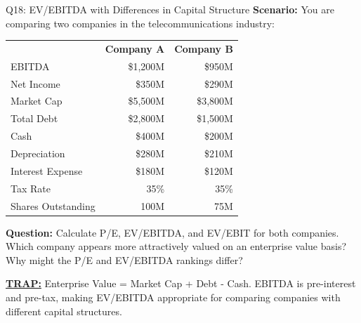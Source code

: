 \documentclass{beamer}
\renewcommand{\scriptsize}{\fontsize{6pt}{7pt}\selectfont}
\begin{document}
	\begin{frame}{Q18: EV/EBITDA with Differences in Capital Structure}
		\scriptsize
		\textbf{Scenario:} You are comparing two companies in the telecommunications industry:
		
		\begin{tabular}{lrr}
			& \textbf{Company A} & \textbf{Company B} \\
			EBITDA & \$1,200M & \$950M \\
			Net Income & \$350M & \$290M \\
			Market Cap & \$5,500M & \$3,800M \\
			Total Debt & \$2,800M & \$1,500M \\
			Cash & \$400M & \$200M \\
			Depreciation & \$280M & \$210M \\
			Interest Expense & \$180M & \$120M \\
			Tax Rate & 35\% & 35\% \\
			Shares Outstanding & 100M & 75M \\
		\end{tabular}
		
		\textbf{Question:} Calculate P/E, EV/EBITDA, and EV/EBIT for both companies. Which company appears more attractively valued on an enterprise value basis? Why might the P/E and EV/EBITDA rankings differ?
		
		\vspace{2pt}
		\underline{\textbf{TRAP:}} Enterprise Value = Market Cap + Debt - Cash. EBITDA is pre-interest and pre-tax, making EV/EBITDA appropriate for comparing companies with different capital structures.
	\end{frame}
	
\end{document}
